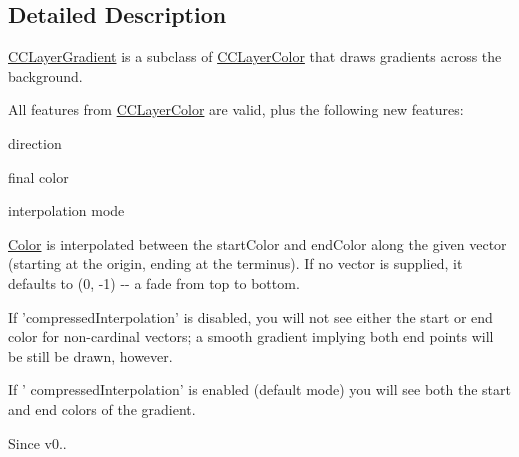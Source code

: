 \subsection{Detailed Description}
\hyperlink{interface_c_c_layer_gradient}{C\-C\-Layer\-Gradient} is a subclass of \hyperlink{interface_c_c_layer_color}{C\-C\-Layer\-Color} that draws gradients across the background.

All features from \hyperlink{interface_c_c_layer_color}{C\-C\-Layer\-Color} are valid, plus the following new features\-:
\begin{DoxyItemize}
\item direction
\item final color
\item interpolation mode
\end{DoxyItemize}

\hyperlink{struct_color}{Color} is interpolated between the start\-Color and end\-Color along the given vector (starting at the origin, ending at the terminus). If no vector is supplied, it defaults to (0, -\/1) -\/-\/ a fade from top to bottom.

If 'compressed\-Interpolation' is disabled, you will not see either the start or end color for non-\/cardinal vectors; a smooth gradient implying both end points will be still be drawn, however.

If ' compressed\-Interpolation' is enabled (default mode) you will see both the start and end colors of the gradient.

\begin{DoxySince}{Since}
v0.. 
\end{DoxySince}



